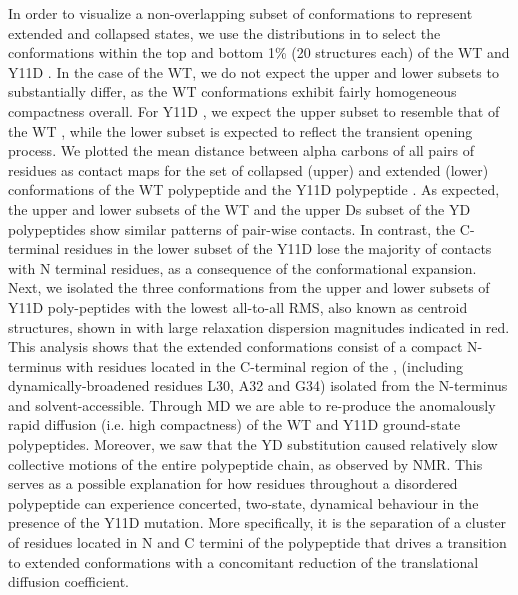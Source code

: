 In order to visualize a non-overlapping subset of conformations to represent extended and collapsed states, we use the \diffusion distributions in  to select the conformations within the top and bottom 1\% (20 structures each) of the WT \gct and Y11D \gct. In the case of the WT, we do not expect the upper and lower \diffusion subsets to substantially differ, as the WT \gct conformations exhibit fairly homogeneous compactness overall. For Y11D \gct, we expect the upper \diffusion subset to resemble that of the WT \gct, while the lower \diffusion subset is expected to reflect the transient opening process. We plotted the mean distance between alpha carbons of all pairs of residues as contact maps for the set of collapsed (upper) and extended (lower) conformations of the WT \gct polypeptide  and the Y11D \gct polypeptide .   As expected, the upper and lower \diffusion subsets of the WT \gct and the upper Ds subset of the YD \gct polypeptides show similar patterns of pair-wise contacts.  In contrast, the C-terminal residues in the lower \diffusion subset of the Y11D \gct lose the majority of contacts with N terminal residues, as a consequence of the conformational expansion. Next, we isolated the three conformations from the upper and lower \diffusion subsets of  Y11D \gct poly-peptides with the lowest all-to-all RMS, also known as centroid structures, shown in  with large relaxation dispersion magnitudes indicated in red. This analysis shows that the extended conformations consist of a compact N-terminus with residues located in the C-terminal region of the \gct, (including dynamically-broadened residues L30, A32 and G34) isolated from the N-terminus and solvent-accessible. Through MD we are able to re-produce the anomalously rapid diffusion (i.e. high compactness) of the WT and Y11D ground-state \gct polypeptides. Moreover, we saw that the YD substitution caused relatively slow collective motions of the entire polypeptide chain, as observed by NMR. This serves as a possible explanation for how residues throughout a disordered polypeptide can experience concerted, two-state, dynamical behaviour in the presence of the Y11D mutation. More specifically, it is the separation of a cluster of residues located in N and C termini of the \gct polypeptide that drives a transition to extended conformations with a concomitant  reduction of the translational diffusion coefficient.


